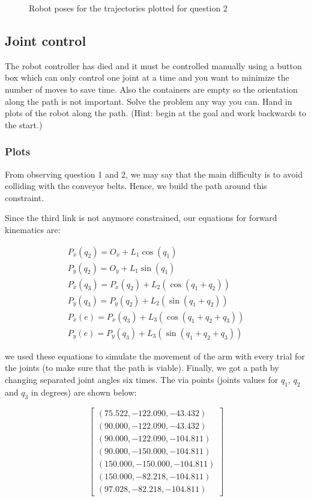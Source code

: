 \documentclass[10pt,a4paper]{article}
\begin{document}
\begin{figure}[h]
{	          \label{fig:Q2Pos5}
              }              
            \caption{ Robot poses for the trajectories plotted for question 2 }
            \label{fig:Q2}
	\end{figure}


\subsection{ Joint control} 
The robot controller has died and it must be controlled manually using a button box which can only control one joint at a time and you want to minimize the number of moves to save time. Also the containers are empty so the orientation along the path is not important. Solve the problem any way you can. Hand in plots of the robot along the path. (Hint: begin at the goal and work backwards to the start.)

\subsubsection*{Plots}
From observing question 1 and 2, we may say that the main difficulty is to avoid colliding with the conveyor belts. Hence, we build the path around this constraint.
\smallskip

Since the third link is not anymore constrained, our equations for forward kinematics are:

\[ \begin{matrix}
P_{x}(q_{2}) = O_{x} + L_{1} \cos(q_{1}) \\
P_{y}(q_{2}) = O_{y} + L_{1} \sin(q_{1}) \\
P_{x}(q_{3}) = P_{x}(q_{2}) + L_{2} ( \cos(q_{1} + q_{2}) ) \\
P_{y}(q_{3}) = P_{y}(q_{2}) + L_{2} ( \sin(q_{1} + q_{2}) ) \\
P_{x}(e) = P_{x}(q_{3}) + L_{3} ( \cos(q_{1} + q_{2} + q_{3}) ) \\
P_{y}(e) = P_{y}(q_{3}) + L_{3} ( \sin(q_{1} + q_{2} + q_{3}) )
\end{matrix} \]

we used these equations to simulate the movement of the arm with every trial for the joints (to make sure that the path is viable). Finally, we got a path by changing separated joint angles six  times. The via points (joints values for $q_{1}$, $q_{2}$ and $q_{3}$ in degrees) are shown below: 

\[ 
\begin{bmatrix}
(75.522, -122.090, -43.432) \\
(90.000, -122.090, -43.432) \\
(90.000, -122.090, -104.811) \\
(90.000, -150.000, -104.811) \\
(150.000, -150.000, -104.811) \\
(150.000, -82.218, -104.811) \\
(97.028, -82.218, -104.811)
\end{bmatrix}
\]
\end{document}
